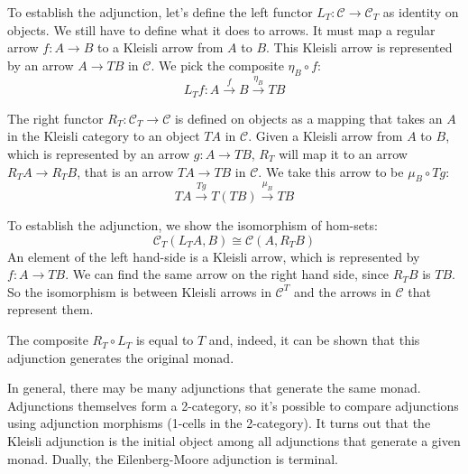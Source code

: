 \documentclass[DaoFP]{subfiles}
\begin{document}
To establish the adjunction, let's define the left functor $L_T \colon \mathcal{C} \to \mathcal{C}_T$ as identity on objects. We still have to define what it does to arrows. It must map a regular arrow $f \colon A \to B$ to a Kleisli arrow from $A$ to $B$. This Kleisli arrow is represented by an arrow $A \to T B$ in $\mathcal{C}$. We pick the composite $\eta_B \circ f$:
\[ L_T f \colon A \xrightarrow{f} B \xrightarrow{\eta_B} T B\]

The right functor $R_T \colon \mathcal{C}_T \to \mathcal{C}$ is defined on objects as a mapping that takes an $A$ in the Kleisli category to an object $T A$ in $\mathcal{C}$. Given a Kleisli arrow from $A$ to $B$, which is represented by an arrow $g \colon A \to T B$, $R_T$ will map it to an arrow $R_T A \to R_T B$, that is an arrow $T A \to T B$ in $\mathcal{C}$. We take this arrow to be $\mu_B \circ T g$:
\[  T A \xrightarrow{T g} T(T B) \xrightarrow{\mu_B} T B\]

To establish the adjunction, we show the isomorphism of hom-sets:
\[\mathcal{C}_T(L_T A, B) \cong \mathcal{C}(A, R_T B)\]
An element of the left hand-side is a Kleisli arrow, which is represented by $f \colon A \to T B$. We can find the same arrow on the right hand side, since $R_T B$ is $T B$. So the isomorphism is between Kleisli arrows in $\mathcal{C}^T$ and the arrows in $\mathcal{C}$ that represent them.

The composite $R_T \circ L_T$ is equal to $T$ and, indeed, it can be shown that this adjunction generates the original monad. 

In general, there may be many adjunctions that generate the same monad. Adjunctions themselves form a 2-category, so it's possible to compare adjunctions using adjunction morphisms (1-cells in the 2-category). It turns out that the Kleisli adjunction is the initial object among all adjunctions that generate a given monad. Dually, the Eilenberg-Moore adjunction is terminal. 
\end{document}
